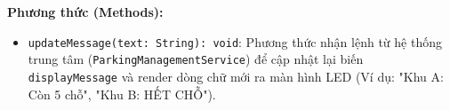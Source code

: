 \noindent\textbf{Phương thức (Methods):}
\begin{itemize}
    \item \texttt{updateMessage(text: String): void}: Phương thức nhận lệnh từ hệ thống trung tâm (\texttt{ParkingManagementService}) để cập nhật lại biến \texttt{displayMessage} và render dòng chữ mới ra màn hình LED (Ví dụ: "Khu A: Còn 5 chỗ", "Khu B: HẾT CHỖ").
\end{itemize}